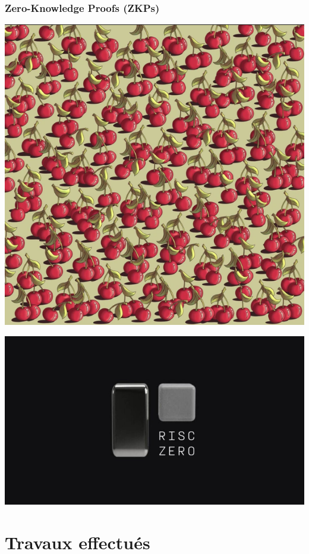 \documentclass[aspectratio=169]{beamer}
\begin{document}
\begin{frame}
\frametitle{Zero-Knowledge Proofs (ZKPs)}

\begin{minipage}{0.48\textwidth}
    \centering
    \includegraphics[width=\linewidth]{zkpimg.png}
\end{minipage}
\hfill
\begin{minipage}{0.48\textwidth}
    \centering
    \includegraphics[width=\linewidth]{risczero.jpg}
\end{minipage}
\end{frame}

\section{Travaux effectués}
\end{document}
